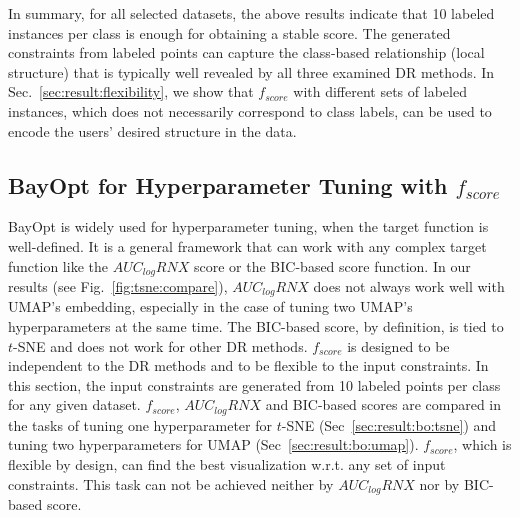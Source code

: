 In summary, for all selected datasets, the above results indicate that 10 labeled instances per class is enough for obtaining a stable score.
The generated constraints from labeled points can capture the class-based relationship (local structure) that is typically well revealed by all three examined DR methods.
In Sec.~\ref{sec:result:flexibility}, we show that $f_{score}$ with different sets of labeled instances, which does not necessarily correspond to class labels,
can be used to encode the users' desired structure in the data.


\subsection{BayOpt for Hyperparameter Tuning with $f_{score}$}\label{sec:result:bo}
BayOpt is widely used for hyperparameter tuning, when the target function is well-defined.
It is a general framework that can work with any complex target function like the $AUC_{log}RNX$ score or the BIC-based score function.
In our results (see Fig.~\ref{fig:tsne:compare}), $AUC_{log}RNX$ does not always work well with UMAP's embedding, especially in the case of tuning two UMAP's hyperparameters at the same time.
The BIC-based score, by definition, is tied to $t$-SNE and does not work for other DR methods.
$f_{score}$ is designed to be independent to the DR methods and to be flexible to the input constraints.
In this section, the input constraints are generated from 10 labeled points per class for any given dataset.
$f_{score}$, $AUC_{log}RNX$ and BIC-based scores are compared in the tasks of tuning one hyperparameter for $t$-SNE (Sec~\ref{sec:result:bo:tsne}) and tuning two hyperparameters for UMAP (Sec~\ref{sec:result:bo:umap}).
$f_{score}$, which is flexible by design, can find the best visualization w.r.t. any set of input constraints.
This task can not be achieved neither by $AUC_{log}RNX$ nor by BIC-based score.

